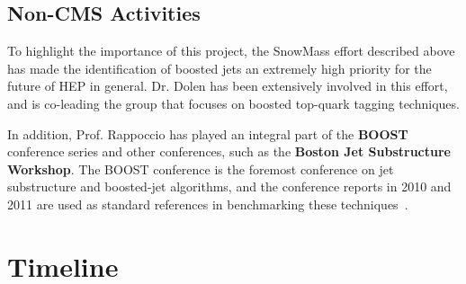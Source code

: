 \documentclass[12pt]{proposalnsf}
\begin{document}
\subsection{Non-CMS Activities}
To highlight the importance of this project, the SnowMass effort
described above has made the identification of boosted jets an
extremely high priority for the future of HEP in general. Dr. Dolen
has been extensively involved in this effort, and is co-leading the
group that focuses on boosted top-quark tagging techniques. 

In addition, Prof. Rappoccio has played an integral part of the {\bf BOOST}
conference series and other conferences, such as the {\bf Boston Jet
  Substructure Workshop}. The BOOST conference is the foremost
conference on jet substructure and boosted-jet algorithms, and the
conference reports in 2010 and 2011 are used as standard references in
benchmarking these techniques~\cite{boost2010,boost2011}.



\clearpage
\section{Timeline}
\label{sec:timeline}
\end{document}
